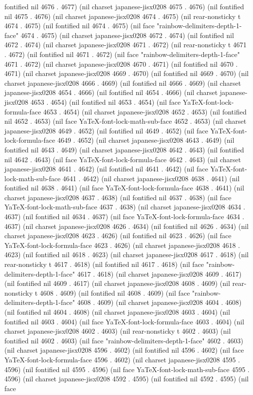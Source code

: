 fontified nil 4676 . 4677) (nil charset japanese-jisx0208 4675 . 4676) (nil fontified nil 4675 . 4676) (nil charset japanese-jisx0208 4674 . 4675) (nil rear-nonsticky t 4674 . 4675) (nil fontified nil 4674 . 4675) (nil face "rainbow-delimiters-depth-1-face" 4674 . 4675) (nil charset japanese-jisx0208 4672 . 4674) (nil fontified nil 4672 . 4674) (nil charset japanese-jisx0208 4671 . 4672) (nil rear-nonsticky t 4671 . 4672) (nil fontified nil 4671 . 4672) (nil face "rainbow-delimiters-depth-1-face" 4671 . 4672) (nil charset japanese-jisx0208 4670 . 4671) (nil fontified nil 4670 . 4671) (nil charset japanese-jisx0208 4669 . 4670) (nil fontified nil 4669 . 4670) (nil charset japanese-jisx0208 4666 . 4669) (nil fontified nil 4666 . 4669) (nil charset japanese-jisx0208 4654 . 4666) (nil fontified nil 4654 . 4666) (nil charset japanese-jisx0208 4653 . 4654) (nil fontified nil 4653 . 4654) (nil face YaTeX-font-lock-formula-face 4653 . 4654) (nil charset japanese-jisx0208 4652 . 4653) (nil fontified nil 4652 . 4653) (nil face YaTeX-font-lock-math-sub-face 4652 . 4653) (nil charset japanese-jisx0208 4649 . 4652) (nil fontified nil 4649 . 4652) (nil face YaTeX-font-lock-formula-face 4649 . 4652) (nil charset japanese-jisx0208 4643 . 4649) (nil fontified nil 4643 . 4649) (nil charset japanese-jisx0208 4642 . 4643) (nil fontified nil 4642 . 4643) (nil face YaTeX-font-lock-formula-face 4642 . 4643) (nil charset japanese-jisx0208 4641 . 4642) (nil fontified nil 4641 . 4642) (nil face YaTeX-font-lock-math-sub-face 4641 . 4642) (nil charset japanese-jisx0208 4638 . 4641) (nil fontified nil 4638 . 4641) (nil face YaTeX-font-lock-formula-face 4638 . 4641) (nil charset japanese-jisx0208 4637 . 4638) (nil fontified nil 4637 . 4638) (nil face YaTeX-font-lock-math-sub-face 4637 . 4638) (nil charset japanese-jisx0208 4634 . 4637) (nil fontified nil 4634 . 4637) (nil face YaTeX-font-lock-formula-face 4634 . 4637) (nil charset japanese-jisx0208 4626 . 4634) (nil fontified nil 4626 . 4634) (nil charset japanese-jisx0208 4623 . 4626) (nil fontified nil 4623 . 4626) (nil face YaTeX-font-lock-formula-face 4623 . 4626) (nil charset japanese-jisx0208 4618 . 4623) (nil fontified nil 4618 . 4623) (nil charset japanese-jisx0208 4617 . 4618) (nil rear-nonsticky t 4617 . 4618) (nil fontified nil 4617 . 4618) (nil face "rainbow-delimiters-depth-1-face" 4617 . 4618) (nil charset japanese-jisx0208 4609 . 4617) (nil fontified nil 4609 . 4617) (nil charset japanese-jisx0208 4608 . 4609) (nil rear-nonsticky t 4608 . 4609) (nil fontified nil 4608 . 4609) (nil face "rainbow-delimiters-depth-1-face" 4608 . 4609) (nil charset japanese-jisx0208 4604 . 4608) (nil fontified nil 4604 . 4608) (nil charset japanese-jisx0208 4603 . 4604) (nil fontified nil 4603 . 4604) (nil face YaTeX-font-lock-formula-face 4603 . 4604) (nil charset japanese-jisx0208 4602 . 4603) (nil rear-nonsticky t 4602 . 4603) (nil fontified nil 4602 . 4603) (nil face "rainbow-delimiters-depth-1-face" 4602 . 4603) (nil charset japanese-jisx0208 4596 . 4602) (nil fontified nil 4596 . 4602) (nil face YaTeX-font-lock-formula-face 4596 . 4602) (nil charset japanese-jisx0208 4595 . 4596) (nil fontified nil 4595 . 4596) (nil face YaTeX-font-lock-math-sub-face 4595 . 4596) (nil charset japanese-jisx0208 4592 . 4595) (nil fontified nil 4592 . 4595) (nil face 